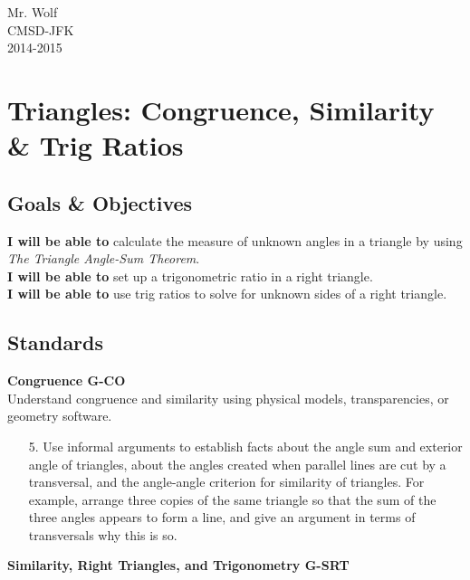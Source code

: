 \documentclass[12pt]{article}
\begin{document}
Mr. Wolf  \\ CMSD-JFK\\2014-2015

\section*{Triangles: Congruence, Similarity \& Trig Ratios}

\subsection*{Goals \& Objectives}

\textbf{I will be able to} calculate the measure of unknown angles in a triangle by using \textit{The Triangle Angle-Sum Theorem}.\\

\textbf{I will be able to} set up a trigonometric ratio in a right triangle.\\

\textbf{I will be able to} use trig ratios to solve for unknown sides of a right triangle.\\

\subsection*{Standards}

\textbf{Congruence \hfill G-CO}\\

Understand congruence and similarity using physical models, transparencies, or geometry software.\\

\begin{enumerate}

	\item[5.] Use informal arguments to establish facts about the angle sum and exterior angle of triangles, about the angles created when parallel lines are cut by a transversal, and the angle-angle criterion for similarity of triangles. For example, arrange three copies of the same triangle so that the sum of the three angles appears to form a line, and give an argument in terms of transversals why this is so.

\end{enumerate}



\textbf{Similarity, Right Triangles, and Trigonometry \hfill G-SRT}\\
\end{document}

